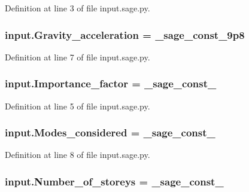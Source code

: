 Definition at line 3 of file input.\+sage.\+py.

\hypertarget{namespaceinput_a55ab15c1c171513e99332aa50c723764}{}
\subsubsection[{Gravity\+\_\+acceleration}]{\setlength{\rightskip}{0pt plus 5cm}input.\+Gravity\+\_\+acceleration = {\bf \+\_\+sage\+\_\+const\+\_\+9p8}}\label{namespaceinput_a55ab15c1c171513e99332aa50c723764}


Definition at line 7 of file input.\+sage.\+py.

\hypertarget{namespaceinput_a0840d963ea24db338f3ab4457defb494}{}
\subsubsection[{Importance\+\_\+factor}]{\setlength{\rightskip}{0pt plus 5cm}input.\+Importance\+\_\+factor = \+\_\+sage\+\_\+const\+\_}\label{namespaceinput_a0840d963ea24db338f3ab4457defb494}


Definition at line 5 of file input.\+sage.\+py.

\hypertarget{namespaceinput_adb7aca4735796aaa4a46456d3edeac2e}{}
\subsubsection[{Modes\+\_\+considered}]{\setlength{\rightskip}{0pt plus 5cm}input.\+Modes\+\_\+considered = \+\_\+sage\+\_\+const\+\_}\label{namespaceinput_adb7aca4735796aaa4a46456d3edeac2e}


Definition at line 8 of file input.\+sage.\+py.

\hypertarget{namespaceinput_a10237b312ba44e8c8090db86059c5803}{}
\subsubsection[{Number\+\_\+of\+\_\+storeys}]{\setlength{\rightskip}{0pt plus 5cm}input.\+Number\+\_\+of\+\_\+storeys = \+\_\+sage\+\_\+const\+\_}\label{namespaceinput_a10237b312ba44e8c8090db86059c5803}



